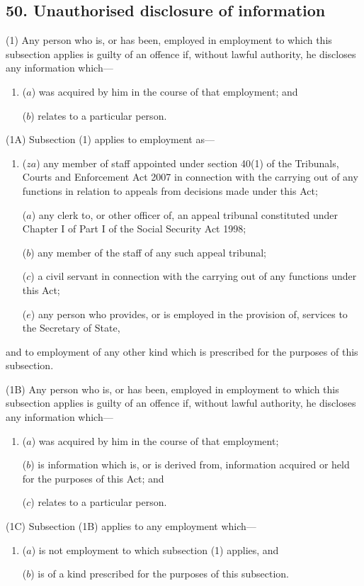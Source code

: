 \documentclass[a4paper]{article}
\begin{document}
\subsection{50. Unauthorised disclosure of information}

(1) Any person who is, or has been, employed in employment to which this subsection applies is guilty of an offence if, without lawful authority, he discloses any information which---
\begin{enumerate}\item[]
($a$)
was acquired by him in the course of that employment; and

($b$)
relates to a particular person.
\end{enumerate}

(1A) Subsection (1) applies to employment as---
\begin{enumerate}\item[]
 ($za$) any member of staff appointed under section 40(1) of the Tribunals, Courts and Enforcement Act 2007 in connection with the carrying out of any functions in relation to appeals from decisions made under this Act;

($a$) any clerk to, or other officer of, an appeal tribunal constituted under Chapter I of Part I of the Social Security Act 1998; 

($b$) any member of the staff of any such appeal tribunal;

($c$)
a civil servant in connection with the carrying out of any functions under this Act;

($e$)
any person who provides, or is employed in the provision of, services to the Secretary of State,
\end{enumerate}
and to employment of any other kind which is prescribed for the purposes of this subsection.

(1B) Any person who is, or has been, employed in employment to which this subsection applies is guilty of an offence if, without lawful authority, he discloses any information which---
\begin{enumerate}\item[]
($a$)
was acquired by him in the course of that employment;

($b$)
is information which is, or is derived from, information acquired or held for the purposes of this Act; and

($c$)
relates to a particular person.
\end{enumerate}

(1C)
Subsection (1B) applies to any employment which---
\begin{enumerate}\item[]
($a$)
is not employment to which subsection (1) applies, and

($b$)
is of a kind prescribed for the purposes of this subsection.
\end{enumerate}
\end{document}
